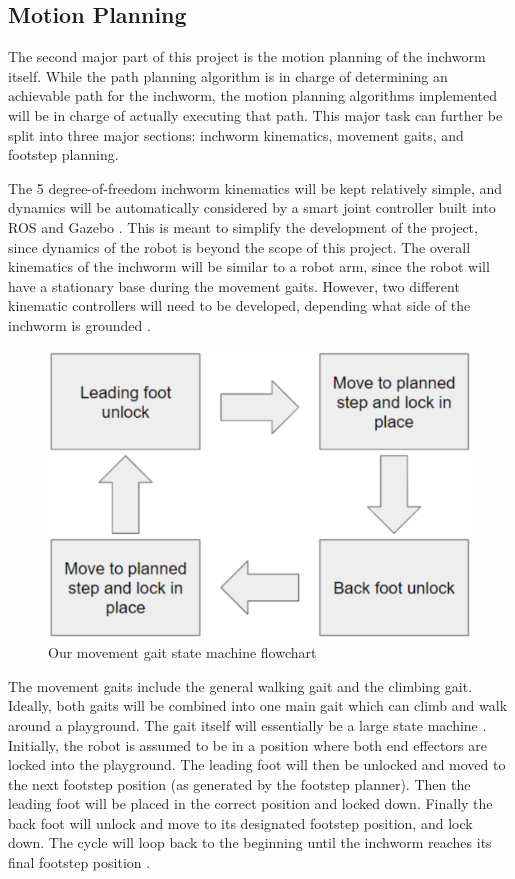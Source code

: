 \subsection{Motion Planning}
The second major part of this project is the motion planning of the inchworm itself. While the path planning algorithm is in charge of determining an achievable path for the inchworm, the motion planning algorithms implemented will be in charge of actually executing that path. This major task can further be split into three major sections: inchworm kinematics, movement gaits, and footstep planning.

The 5 degree-of-freedom inchworm kinematics will be kept relatively simple, and dynamics will be automatically considered by a smart joint controller built into ROS and Gazebo \cite{ROSControl}. This is meant to simplify the development of the project, since dynamics of the robot is beyond the scope of this project. The overall kinematics of the inchworm will be similar to a robot arm, since the robot will have a stationary base during the movement gaits. However, two different kinematic controllers will need to be developed, depending what side of the inchworm is grounded \cite{PlanarInchWormDesign}.

\begin{figure}[ht]
    \includegraphics[width=\linewidth]{figures/GaitFlowChart.png}
    \caption{Our movement gait state machine flowchart}
    \label{fig:GaitFlowChart}
\end{figure} 

The movement gaits include the general walking gait and the climbing gait. Ideally, both gaits will be combined into one main gait which can climb and walk around a playground. The gait itself will essentially be a large state machine \cite{LeggedRobotsNavPlanning}. Initially, the robot is assumed to be in a position where both end effectors are locked into the playground. The leading foot will then be unlocked and moved to the next footstep position (as generated by the footstep planner). Then the leading foot will be placed in the correct position and locked down. Finally the back foot will unlock and move to its designated footstep position, and lock down. The cycle will loop back to the beginning until the inchworm reaches its final footstep position \cite{InchwormLocomotion} \cite{GaitGeneration}.

